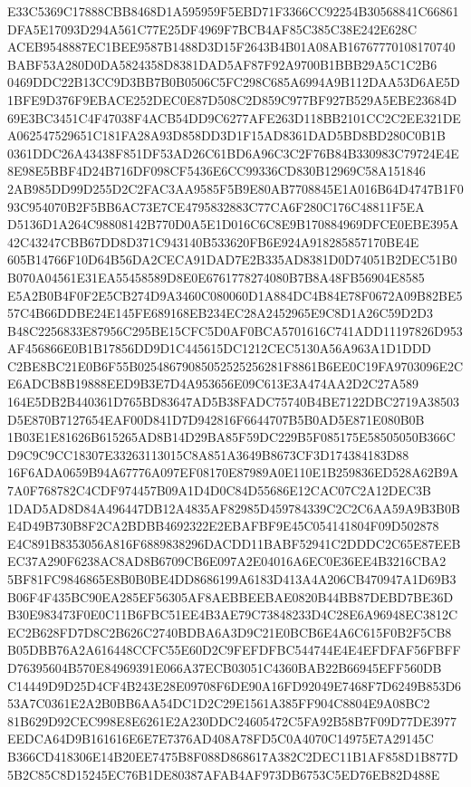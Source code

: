 \documentclass[UTF8,fontset=fandol,zihao=-4,a4paper]{ctexart}
\begin{document}
{{E33C5369C17888CBB8468D1A595959F5EBD71F3366CC92254B30568841C66861DFA5E17093D294A561C77E25DF4969F7BCB4AF85C385C38E242E628C
ACEB9548887EC1BEE9587B1488D3D15F2643B4B01A08AB16767770108170740BABF53A280D0DA5824358D8381DAD5AF87F92A9700B1BBB29A5C1C2B6
0469DDC22B13CC9D3BB7B0B0506C5FC298C685A6994A9B112DAA53D6AE5D1BFE9D376F9EBACE252DEC0E87D508C2D859C977BF927B529A5EBE23684D
69E3BC3451C4F47038F4ACB54DD9C6277AFE263D118BB2101CC2C2EE321DEA062547529651C181FA28A93D858DD3D1F15AD8361DAD5BD8BD280C0B1B
0361DDC26A43438F851DF53AD26C61BD6A96C3C2F76B84B330983C79724E4E8E98E5BBF4D24B716DF098CF5436E6CC99336CD830B12969C58A151846
2AB985DD99D255D2C2FAC3AA9585F5B9E80AB7708845E1A016B64D4747B1F093C954070B2F5BB6AC73E7CE4795832883C77CA6F280C176C48811F5EA
D5136D1A264C98808142B770D0A5E1D016C6C8E9B170884969DFCE0EBE395A42C43247CBB67DD8D371C943140B533620FB6E924A918285857170BE4E
605B14766F10D64B56DA2CECA91DAD7E2B335AD8381D0D74051B2DEC51B0B070A04561E31EA55458589D8E0E6761778274080B7B8A48FB56904E8585
E5A2B0B4F0F2E5CB274D9A3460C080060D1A884DC4B84E78F0672A09B82BE557C4B66DDBE24E145FE689168EB234EC28A2452965E9C8D1A26C59D2D3
B48C2256833E87956C295BE15CFC5D0AF0BCA5701616C741ADD11197826D953AF456866E0B1B17856DD9D1C445615DC1212CEC5130A56A963A1D1DDD
C2BE8BC21E0B6F55B02548679085052525256281F8861B6EE0C19FA9703096E2CE6ADCB8B19888EED9B3E7D4A953656E09C613E3A474AA2D2C27A589
164E5DB2B440361D765BD83647AD5B38FADC75740B4BE7122DBC2719A38503D5E870B7127654EAF00D841D7D942816F6644707B5B0AD5E871E080B0B
1B03E1E81626B615265AD8B14D29BA85F59DC229B5F085175E58505050B366CD9C9C9CC18307E33263113015C8A851A3649B8673CF3D174384183D88
16F6ADA0659B94A67776A097EF08170E87989A0E110E1B259836ED528A62B9A7A0F768782C4CDF974457B09A1D4D0C84D55686E12CAC07C2A12DEC3B
1DAD5AD8D84A496447DB12A4835AF82985D459784339C2C2C6AA59A9B3B0BE4D49B730B8F2CA2BDBB4692322E2EBAFBF9E45C054141804F09D502878
E4C891B8353056A816F6889838296DACDD11BABF52941C2DDDC2C65E87EEBEC37A290F6238AC8AD8B6709CB6E097A2E04016A6EC0E36EE4B3216CBA2
5BF81FC9846865E8B0B0BE4DD8686199A6183D413A4A206CB470947A1D69B3B06F4F435BC90EA285EF56305AF8AEBBEEBAE0820B44BB87DEBD7BE36D
B30E983473F0E0C11B6FBC51EE4B3AE79C73848233D4C28E6A96948EC3812CEC2B628FD7D8C2B626C2740BDBA6A3D9C21E0BCB6E4A6C615F0B2F5CB8
B05DBB76A2A616448CCFC55E60D2C9FEFDFBC544744E4E4EFDFAF56FBFFD76395604B570E84969391E066A37ECB03051C4360BAB22B66945EFF560DB
C14449D9D25D4CF4B243E28E09708F6DE90A16FD92049E7468F7D6249B853D653A7C0361E2A2B0BB6AA54DC1D2C29E1561A385FF904C8804E9A08BC2
81B629D92CEC998E8E6261E2A230DDC24605472C5FA92B58B7F09D77DE3977EEDCA64D9B161616E6E7E7376AD408A78FD5C0A4070C14975E7A29145C
B366CD418306E14B20EE7475B8F088D868617A382C2DEC11B1AF858D1B877D5B2C85C8D15245EC76B1DE80387AFAB4AF973DB6753C5ED76EB82D488E
}}
\end{document}
